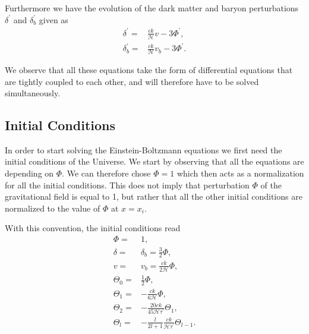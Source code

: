 \documentclass[a4paper, 10pt, reqno]{amsart}
\begin{document}
Furthermore we have the evolution of the dark matter and baryon perturbations $\delta^\prime$ and $\delta_{b}^\prime$ given as
\begin{align}
    \delta^{\prime}= & \frac{c k}{\mathcal{H}} v-3 \Phi^{\prime}, \label{eq: delta}\\
   \delta_{b}^{\prime}= & \frac{c k}{\mathcal{H}} v_{b}-3 \Phi^{\prime}. \label{eq: delta_b}
\end{align}

We observe that all these equations take the form of differential equations that are tightly coupled to each other, and will therefore have to be solved simultaneously.

\subsection{Initial Conditions}
In order to start solving the Einstein-Boltzmann equations we first need the initial conditions of the Universe. We start by observing that all the equations are depending on $\Phi$. We can therefore chose $\Phi = 1$ which then acts as a normalization for all the initial conditions. This does not imply that perturbation $\Phi$ of the gravitational field is equal to 1, but rather that all the other initial conditions are normalized to the value of $\Phi$ at $x = x_i$.

With this convention, the initial conditions read
\begin{align} 
    \Phi = & 1, \\
    \delta = & \delta_{b} = \frac{3}{2} \Phi, \\ 
    v = & v_{b} = \frac{c k}{2 \mathcal{H}} \Phi, \\
    \Theta_{0} = & \frac{1}{2} \Phi, \\
    \Theta_{1} = &-\frac{c k}{6 \mathcal{H}} \Phi, \\
    \Theta_2 = & - \frac{20 c k}{45 \mathcal{H} \tau^\prime} \Theta_1,\\
    \Theta_{l}= &-\frac{l}{2 l+1} \frac{c k}{\mathcal{H} \tau^{\prime}} \Theta_{l-1}.
\end{align}
\end{document}
